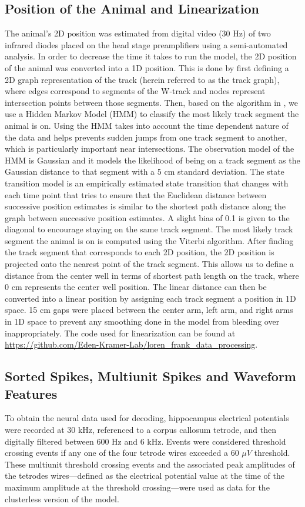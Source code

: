 \documentclass[times, twoside]{zHenriquesLab-StyleBioRxiv}
\begin{document}
\subsection*{Position of the Animal and Linearization}
The animal's 2D position was estimated from digital video (30 Hz) of two infrared diodes placed on the head stage preamplifiers using a semi-automated analysis. In order to decrease the time it takes to run the model, the 2D position of the animal was converted into a 1D position. This is done by first defining a 2D graph representation of the track (herein referred to as the track graph), where edges correspond to segments of the W-track and nodes represent intersection points between those segments. Then, based on the algorithm in \cite{NewsonHiddenMarkovmap2009}, we use a Hidden Markov Model (HMM) to classify the most likely track segment the animal is on. Using the HMM takes into account the time dependent nature of the data and helps prevents sudden jumps from one track segment to another, which is particularly important near intersections. The observation model of the HMM is Gaussian and it models the likelihood of being on a track segment as the Gaussian distance to that segment with a 5 cm standard deviation. The state transition model is an empirically estimated state transition that changes with each time point that tries to ensure that the Euclidean distance between successive position estimates is similar to the shortest path distance along the graph between successive position estimates. A slight bias of 0.1 is given to the diagonal to encourage staying on the same track segment. The most likely track segment the animal is on is computed using the Viterbi algorithm. After finding the track segment that corresponds to each 2D position, the 2D position is projected onto the nearest point of the track segment. This allows us to define a distance from the center well in terms of shortest path length on the track, where 0 cm represents the center well position. The linear distance can then be converted into a linear position by assigning each track segment a position in 1D space. 15 cm gaps were placed between the center arm, left arm, and right arms in 1D space to prevent any smoothing done in the model from bleeding over inappropriately. The code used for linearization can be found at \url{https://github.com/Eden-Kramer-Lab/loren_frank_data_processing}.

\subsection*{Sorted Spikes, Multiunit Spikes and Waveform Features}
To obtain the neural data used for decoding, hippocampus electrical potentials were recorded at 30 kHz, referenced to a corpus callosum tetrode, and then digitally filtered between 600 Hz and 6 kHz. Events were considered threshold crossing events if any one of the four tetrode wires exceeded a 60 $\mu V$ threshold. These multiunit threshold crossing events and the associated peak amplitudes of the tetrodes wires---defined as the electrical potential value at the time of the maximum amplitude at the threshold crossing---were used as data for the clusterless version of the model.
\end{document}
